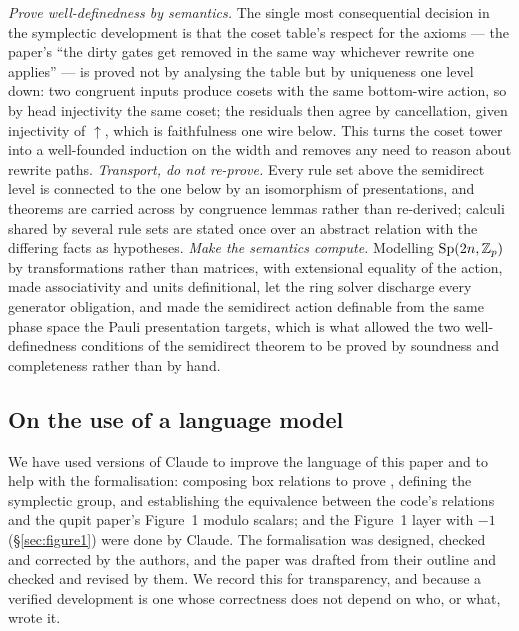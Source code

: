 \emph{Prove well-definedness by semantics.}  The single most
consequential decision in the symplectic development is that the coset
table's respect for the axioms --- the paper's ``the dirty gates get
removed in the same way whichever rewrite one applies'' --- is proved
not by analysing the table but by uniqueness one level down: two
congruent inputs produce cosets with the same bottom-wire action, so by
head injectivity the same coset; the residuals then agree by
cancellation, given injectivity of $\uparrow$, which is faithfulness
one wire below.  This turns the coset tower into a well-founded
induction on the width and removes any need to reason about rewrite
paths.  \emph{Transport, do not re-prove.}  Every rule set above the
semidirect level is connected to the one below by an isomorphism of
presentations, and theorems are carried across by congruence lemmas
rather than re-derived; calculi shared by several rule sets are stated
once over an abstract relation with the differing facts as hypotheses.
\emph{Make the semantics compute.}  Modelling $\mathrm{Sp}(2n,\mathbb{Z}_p)$ by transformations
rather than matrices, with extensional equality of the action, made
associativity and units definitional, let the ring solver discharge
every generator obligation, and made the semidirect action definable
from the same phase space the Pauli presentation targets, which is what
allowed the two well-definedness conditions of the semidirect theorem
to be proved by soundness and completeness rather than by hand.

\subsection{On the use of a language model}

We have used versions of Claude to improve the language of this paper
and to help with the formalisation: composing box relations to prove
, defining the symplectic group, and establishing the
equivalence between the code's relations and the qupit paper's
Figure~1 modulo scalars;  and the Figure~1
layer with $-1$ (\S\ref{sec:figure1}) were done by Claude.
The formalisation was designed, checked and corrected by the authors,
and the paper was drafted from their outline and checked and revised
by them.  We record this for transparency, and because a verified
development is one whose correctness does not depend on who, or what,
wrote it.
